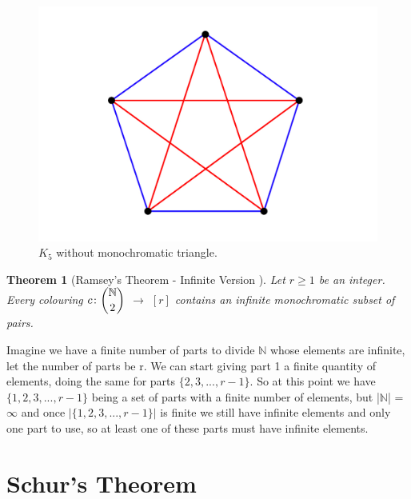\documentclass[12pt,twoside,a4paper]{book}
\numberwithin{equation}{section}
\newtheorem{theorem}             {Theorem}[section]
\theoremstyle{remark}
\begin{document}
\begin{figure}[H]
     \centering
     \includegraphics[scale=1]{Figuras/K5-sem-triangulo.jpg}
     \caption{$K_5$ without monochromatic triangle.}
     \label{fig:K5}
\end{figure}

\begin{theorem}[{Ramsey's Theorem - Infinite Version \cite{Ra29}}]\label{thm:RamseyTheorem}
Let $r \geq 1$ be an integer. Every colouring $c\colon \dbinom{\mathbb{N}}{2}$ $\rightarrow$ $[r]$ contains an infinite monochromatic subset of pairs.
\end{theorem}

Imagine we have a finite number of parts to divide $\mathbb{N}$ whose elements are infinite, let the number of parts be r. We can start giving part 1 a finite quantity of elements, doing the same for parts $\{2, 3,..., r-1\}$. So at this point we have $\{1,2,3,...,r-1\}$ being a set of parts with a finite number of elements, but |$\mathbb{N}$| = $\infty$ and once $|\{1, 2, 3,..., r-1\}|$ is finite we still have infinite elements and only one part to use, so at least one of these parts must have infinite elements.

\section{Schur's Theorem}
\end{document}
